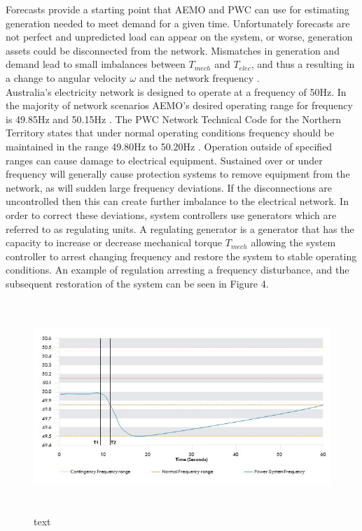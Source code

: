 \documentclass[12pt, a4paper]{article}
\begin{document}
Forecasts provide a starting point that AEMO and PWC can use for estimating generation needed to meet demand for a given time. Unfortunately forecasts are not perfect and unpredicted load can appear on the system, or worse, generation assets could be disconnected from the network. Mismatches in generation and demand lead to small imbalances between $T_{mech}$ and $T_{elec}$, and thus a resulting in a change to angular velocity $\omega$ and the network frequency \cite{Glover2012}.\\

Australia's electricity network is designed to operate at a frequency of 50$\si{\hertz}$. In the majority of network scenarios AEMO's desired operating range for frequency is 49.85$\si{\hertz}$ and 50.15$\si{\hertz}$ \cite{AEMO2012}. The PWC Network Technical Code for the Northern Territory states that under normal operating conditions frequency should be maintained in the range 49.80$\si{\hertz}$ to 50.20$\si{\hertz}$ \cite{PWC2018}. Operation outside of specified ranges can cause damage to electrical equipment. Sustained over or under frequency will generally cause protection systems to remove equipment from the network, as will sudden large frequency deviations. If the disconnections are uncontrolled then this can create further imbalance to the electrical network. In order to correct these deviations, system controllers use generators which are referred to as regulating units. A regulating generator is a generator that has the capacity to increase or decrease mechanical torque $T_{mech}$ allowing the system controller to arrest changing frequency and restore the system to stable operating conditions. An example of regulation arresting a frequency disturbance, and the subsequent restoration of the system can be seen in Figure 4.
\begin{figure}[h]
\centering
\includegraphics[height=8cm]{frequency_arrest}
\caption{text}
\end{figure}
\end{document}
